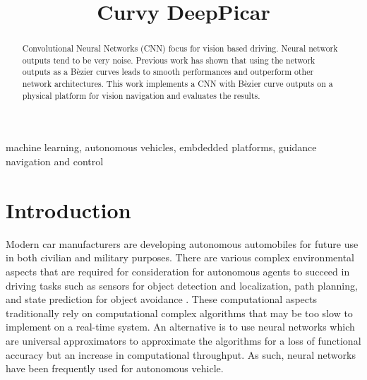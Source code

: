 \documentclass[conference]{IEEEtran}
\begin{document}
\title{Curvy DeepPicar}

\author{
}

\maketitle

\begin{abstract}

Convolutional Neural Networks (CNN) focus for vision based driving.
Neural network outputs tend to be very noise.
Previous work has shown that using the network outputs as a B\`ezier curves leads to smooth performances and outperform other network architectures. This work implements a CNN with B\`ezier curve outputs on a physical platform for vision navigation and evaluates the results.

\end{abstract}

\begin{IEEEkeywords}
machine learning, autonomous vehicles, embdedded platforms, guidance navigation and control
\end{IEEEkeywords}

\section{Introduction}

Modern car manufacturers are developing autonomous automobiles for future use in both civilian and military purposes. There are various complex environmental aspects that are required for consideration for autonomous agents to succeed in driving tasks such as sensors for object detection and localization, path planning, and state prediction for object avoidance \cite{kato2018}. These computational aspects traditionally rely on computational complex algorithms that may be too slow to implement on a real-time system. An alternative is to use neural networks which are universal approximators \cite{wang2021interval} to approximate the algorithms for a loss of functional accuracy but an increase in computational throughput. As such, neural networks have been frequently used for autonomous vehicle.
\end{document}
